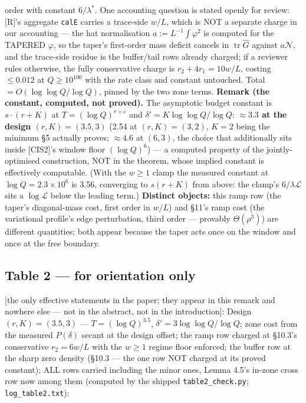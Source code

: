\documentclass[11pt]{amsart}
\newcommand{\tr}{\operatorname{tr}}
\theoremstyle{plain}
\theoremstyle{remark}
\begin{document}
order with constant $6/\lambda^*$. One accounting question is stated openly for
review: [R]'s aggregate \texttt{calE} carries a trace-side $w/L$, which is NOT a
separate charge in our accounting --- the hat normalisation $a := L^{-1}\int\varphi^2$
is computed for the TAPERED $\varphi$, so the taper's first-order mass deficit
cancels in $\tr \widehat{G}$ against $a\mathcal{N}$, and the trace-side residue is
the buffer/tail rows already charged; if a reviewer rules otherwise, the fully
conservative charge is $r_2 + 4r_1 = 10w/L$, costing $\le 0.012$ at $Q \ge 10^{100}$
with the rate class and constant untouched. Total $= O(\log \log Q/\log Q)$, pinned
by the two zone terms. \textbf{Remark (the constant, computed, not proved).} The
asymptotic budget constant is $s\cdot(r + K)$ at $T = (\log Q)^{r+\varepsilon}$ and
$\delta' = K \log \log Q/\log Q$: \textbf{\boldmath$\approx 3.3$ at the design
$(r, K) = (3.5, 3)$} (2.54 at $(r, K) = (3, 2)$, $K = 2$ being the minimum \S5
actually proves; $\approx 4.6$ at $(6, 3)$, the choice that additionally sits inside
[CIS2]'s window floor $(\log Q)^{6}$) --- a computed property of the
jointly-optimised construction, NOT in the theorem, whose implied constant is
effectively computable. (With the $w \ge 1$ clamp the measured constant at
$\log Q = 2.3\times10^6$ is 3.56, converging to $s(r + K)$ from above: the clamp's
$6/\lambda\mathcal{L}$ sits a $\log \mathcal{L}$ below the leading term.)
\textbf{Distinct objects:} this ramp row (the taper's diagonal-mass cost, first order
in $w/L$) and \S11's ramp cost (the variational profile's edge perturbation, third
order --- provably $\Theta(\rho^3)$) are different quantities; both appear because
the taper acts once on the window and once at the free boundary.

\subsection{Table 2 --- for orientation only}
[the only effective statements in the paper; they appear in this remark and nowhere
else --- not in the abstract, not in the introduction]: Design $(r, K) = (3.5, 3)$
--- $T = (\log Q)^{3.5}$, $\delta' = 3 \log \log Q/\log Q$; zone cost from the
measured $P(\delta)$ secant at the design offset; the ramp row charged at \S10.3's
conservative $r_2 = 6w/L$ with the $w \ge 1$ regime floor enforced; the buffer row at
the sharp zero density (\S10.3 --- the one row NOT charged at its proved constant);
ALL rows carried including the minor ones, Lemma 4.5's in-zone cross row now among
them (computed by the shipped \texttt{table2\_check.py}; \texttt{log\_table2.txt}):
\end{document}
